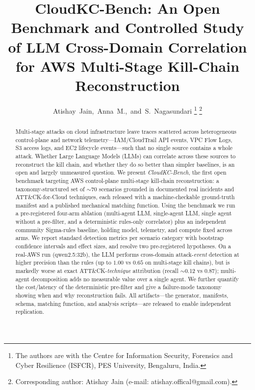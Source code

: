 \documentclass[journal]{IEEEtran}
\begin{document}
\title{CloudKC-Bench: An Open Benchmark and Controlled Study of LLM
Cross-Domain Correlation for AWS Multi-Stage Kill-Chain Reconstruction}

\author{Atishay~Jain,~Anna~M.,~and~S.~Nagasundari%
\thanks{The authors are with the Centre for Information Security, Forensics and
Cyber Resilience (ISFCR), PES University, Bengaluru, India.}%
\thanks{Corresponding author: Atishay Jain (e-mail: atishay.offical@gmail.com).}}


\maketitle

\begin{abstract}
Multi-stage attacks on cloud infrastructure leave traces scattered across
heterogeneous control-plane and network telemetry---IAM/CloudTrail API events, VPC
Flow Logs, S3 access logs, and EC2 lifecycle events---such that no single source
contains a whole attack. Whether Large Language Models (LLMs) can correlate across
these sources to reconstruct the kill chain, and whether they do so better than
simpler baselines, is an open and largely unmeasured question. We present
\emph{CloudKC-Bench}, the first open benchmark targeting AWS control-plane
multi-stage kill-chain reconstruction: a taxonomy-structured set of
$\sim$70 scenarios grounded in documented real incidents and ATT\&CK-for-Cloud
techniques, each released with a machine-checkable ground-truth manifest and a
published mechanical matching function. Using the benchmark we run a pre-registered
four-arm ablation (multi-agent LLM, single-agent LLM, single agent without a
pre-filter, and a deterministic rules-only correlator) plus an independent community
Sigma-rules baseline, holding model, telemetry, and compute fixed across arms.
We report standard detection metrics per scenario category with bootstrap confidence
intervals and effect sizes, and resolve two pre-registered hypotheses. On a real-AWS run
(qwen2.5:32b), the LLM performs cross-domain attack-\emph{event} detection at higher
precision than the rules (up to $1.00$ vs $0.65$ on multi-stage kill chains), but is
markedly worse at exact ATT\&CK-\emph{technique} attribution (recall $\sim$0.12 vs
$0.87$); multi-agent decomposition adds no measurable value over a single agent.
We further quantify the cost/latency of the deterministic pre-filter and give a
failure-mode taxonomy showing when and why reconstruction fails. All artifacts---the
generator, manifests, schema, matching function, and analysis scripts---are released
to enable independent replication.
\end{abstract}
\end{document}
